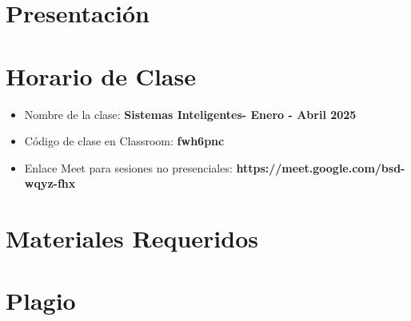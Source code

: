 \documentclass[aspectratio=169]{beamer}
\title[\abreviaturaNombreMateria]{\nombreMateria} %
\author{Dr. Marco Aurelio Nuño Maganda} %
\institute[UPV] %
{
Universidad Politecnica de Victoria \\ %
Ingenieria en Tecnologias de la Informacion \\ %
Cuatrimestre \cuatrimestre  \\ %
\medskip
\textit{mnunom@upv.edu.mx} %
}
\date{\today} %
\newcommand{\nombreMateria}{Sistemas Inteligentes}
\newcommand{\cuatrimestre}{Enero - Abril 2025}
\newcommand{\claveClassroom}{fwh6pnc}
\newcommand{\claveMeet}{https://meet.google.com/bsd-wqyz-fhx}
\begin{document}
\begin{frame}
\titlepage %
\end{frame}




\section{Presentación} 



\section{Horario de Clase}






\begin{frame}
\begin{itemize}
\frametitle{Plataforma Virtual para el Curso}
\item Nombre de la clase: \textbf{\nombreMateria - \cuatrimestre}
\item Código de clase en Classroom: \textbf{\claveClassroom}
\item Enlace Meet para sesiones no presenciales: \textbf{\claveMeet}
\end{itemize}

\end{frame}
















\section{Materiales Requeridos}




\section{Plagio}

\end{document}
